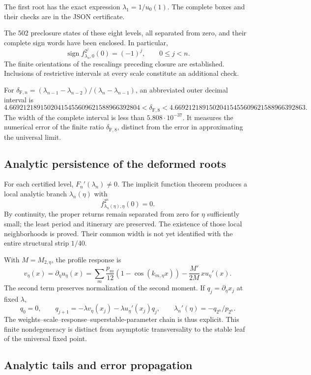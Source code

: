The first root has the exact expression \(\lambda_1=1/u_0(1)\). The complete boxes and their checks are in the JSON certificate.

The 502 preclosure states of these eight levels, all separated from zero, and their complete sign words have been enclosed. In particular,
\[
\operatorname{sign}f_{\lambda_n,0}^{2^j}(0)=(-1)^j,\qquad0\le j<n.
\]
The finite orientations of the rescalings preceding closure are established. Inclusions of restrictive intervals at every scale constitute an additional check.

For \(\delta_{\mathrm F,n}=(\lambda_{n-1}-\lambda_{n-2})/(\lambda_n-\lambda_{n-1})\), an abbreviated outer decimal interval is
\[
\boxed{
4.66921218915020415455609621588966392804
<\delta_{\mathrm F,8}<
4.66921218915020415455609621588966392863.
}
\]
The width of the complete interval is less than \(5.808\cdot10^{-37}\). It measures the numerical error of the finite ratio \(\delta_{\mathrm F,8}\), distinct from the error in approximating the universal limit.


\subsection{Analytic persistence of the deformed roots}
\label{hmtfg:desarrollo:8}

For each certified level, \(F_n'(\lambda_n)\ne0\). The implicit function theorem produces a local analytic branch \(\lambda_n(\eta)\) with
\[
f_{\lambda_n(\eta),\eta}^{2^n}(0)=0.
\]
By continuity, the proper returns remain separated from zero for \(\eta\) sufficiently small; the least period and itinerary are preserved. The existence of those local neighborhoods is proved. Their common width is not yet identified with the entire structural strip \(1/40\).

With \(M=M_{2,\eta}\), the profile response is
\[
v_\eta(x)=\partial_\eta u_\eta(x)
=\sum_m\frac{p_m}{12}(1-\cos(k_{m,\eta}x))
-\frac{M'}{2M}\,x u_\eta'(x).
\]
The second term preserves normalization of the second moment. If \(q_j=\partial_\eta x_j\) at fixed \(\lambda\),
\[
q_0=0,\qquad q_{j+1}=-\lambda v_\eta(x_j)-\lambda u_\eta'(x_j)q_j,
\qquad
\boxed{\lambda_n'(\eta)=-q_{2^n}/p_{2^n}}.
\]
The weights–scale–response–superstable-parameter chain is thus explicit. This finite nondegeneracy is distinct from asymptotic transversality to the stable leaf of the universal fixed point.


\subsection{Analytic tails and error propagation}
\label{hmtfg:desarrollo:9}

